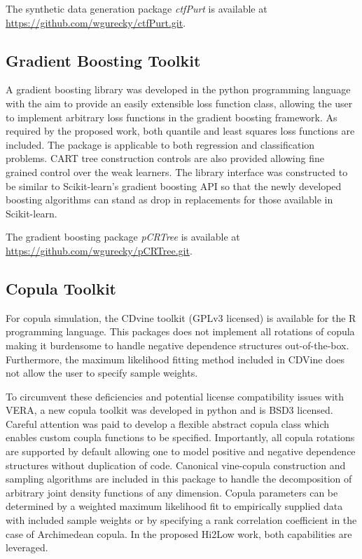 The synthetic data generation package \emph{ctfPurt} is available at \url{https://github.com/wgurecky/ctfPurt.git}.

\subsection{Gradient Boosting Toolkit}

A gradient boosting library was developed in the python programming language with the aim to provide an easily extensible loss function class, allowing the user to implement arbitrary loss functions in the gradient boosting framework.  As required by the proposed work, both quantile and least squares loss functions are included.  The package is applicable to both regression and classification problems.  CART tree construction controls are also provided allowing fine grained control over the weak learners.
The library interface was constructed to be similar to Scikit-learn's gradient boosting API so that the newly developed boosting algorithms can stand as drop in replacements for those available in Scikit-learn.

The gradient boosting package \emph{pCRTree} is available at \url{https://github.com/wgurecky/pCRTree.git}.

\subsection{Copula Toolkit}

For copula simulation, the CDvine toolkit (GPLv3 licensed) is available for the R programming language. This packages does not implement all rotations of copula making it burdensome to handle negative dependence structures out-of-the-box.  Furthermore, the maximum likelihood fitting method included in CDVine does not allow the user to specify sample weights.

To circumvent these deficiencies and potential license compatibility issues with VERA, a new copula toolkit was developed in python and is BSD3 licensed.
Careful attention was paid to develop a flexible abstract copula class which enables custom coupla functions to be specified.  Importantly, all copula rotations are supported by default allowing one to model positive and negative dependence structures without duplication of code.
Canonical vine-copula construction and sampling algorithms are included in this package to handle the decomposition of arbitrary joint density functions of any dimension.
Copula parameters can be determined by a weighted maximum likelihood fit to empirically supplied data with included sample weights or by specifying a rank correlation coefficient in the case of Archimedean copula.  In the proposed Hi2Low work, both capabilities are leveraged.

